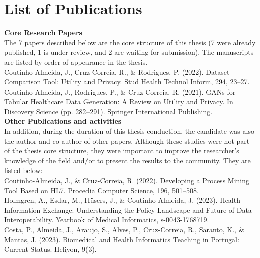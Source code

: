 \chapter*{List of Publications}



\textbf{Core Research Papers} \\
The 7 papers described below are the core structure of this thesis (7 were already published, 1 is under review, and 2 are waiting for submission). The manuscripts are listed by order of appearance in the thesis.
\\

Coutinho-Almeida, J., Cruz-Correia, R., \& Rodrigues, P. (2022). Dataset Comparison Tool: Utility and Privacy. Stud Health Technol Inform, 294, 23–27.\\



Coutinho-Almeida, J., Rodrigues, P., \& Cruz-Correia, R. (2021). GANs for Tabular Healthcare Data Generation: A Review on Utility and Privacy. In Discovery Science (pp. 282–291). Springer International Publishing.\\

\textbf{Other Publications and activities}\\
In addition, during the duration of this thesis conduction, the candidate was also the author and co-author of other papers. Although these studies were not part of the thesis core structure, they were important to improve the researcher's knowledge of the field and/or to present the results to the community. They are listed below:\\


Coutinho-Almeida, J., \& Cruz-Correia, R. (2022). Developing a Process Mining Tool Based on HL7. Procedia Computer Science, 196, 501–508.\\


Holmgren, A., Esdar, M., Hüsers, J., \& Coutinho-Almeida, J. (2023). Health Information Exchange: Understanding the Policy Landscape and Future of Data Interoperability. Yearbook of Medical Informatics, s-0043-1768719.\\



Costa, P., Almeida, J., Araujo, S., Alves, P., Cruz-Correia, R., Saranto, K., \& Mantas, J. (2023). Biomedical and Health Informatics Teaching in Portugal: Current Status. Heliyon, 9(3).\\




